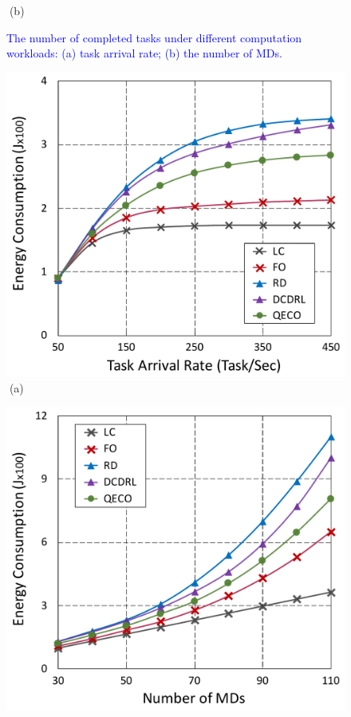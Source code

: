 \documentclass[12pt,draftclsnofoot,onecolumn]{IEEEtran}
\begin{document}
\begin{enumerate}
\begin{figure}[H]
\begin{minipage}[b]{0.33\linewidth}
		\textcolor{white}{i}\hspace{0.6cm}(b)
	\end{minipage}
	\caption{\textcolor{blue}{The number of completed tasks under different computation workloads: (a) task arrival rate; (b) the number of MDs.}}
	\label{chart1}
\end{figure}\vspace{-8mm}
\begin{figure}[H]\centering
	\captionsetup{name=Fig.}
	\begin{minipage}[b]{0.33\linewidth}
		\centering
		\includegraphics[width=\textwidth]{ energy_1} 		
		\textcolor{white}{i}\hspace{0.6cm}(a)
	\end{minipage}
	\hspace{-0.2cm}
	\begin{minipage}[b]{0.33\linewidth}
		\centering
		\includegraphics[width=\textwidth]{ energy_2}

\end{minipage}
\end{figure}
\end{enumerate}
\end{document}

